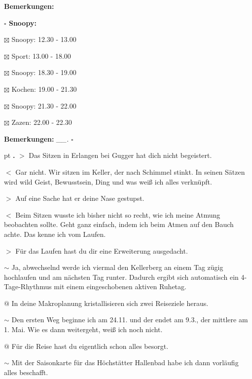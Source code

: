 \documentclass[10pt,a4paper]{article}
\newcounter{notec}
\newcommand\notep[1]{%
  \stepcounter{notec}
  \vskip #1pt
  {\bf\arabic{notec}.}
}
\newcommand\prop[1] {{\color {alizarin} {\bf #1}}}             %
\newcommand\mand[1] {{\color {burntorange} {\bf #1}}}          %
\newcommand\bottomspace{\vskip 4pt}
\newcommand\n[1] { {\sl #1.} \hskip 5pt }
\begin{document}
\begin{mdframed}[style=daystyle]
\begin{labeling}{{\mand {Bemerkungen:}}}
\begin{minipage}{0.75\textwidth}
\begin{labeling}{\prop {$\square$ {Snoopy:}}}
      \item[$\boxtimes$ Snoopy:] 12.30 - 13.00
      \item[$\boxtimes$ Sport:]  13.00 - 18.00
        
      \item[$\boxtimes$ Snoopy:] 18.30 - 19.00
      \item[$\boxtimes$ Kochen:] 19.00 - 21.30
        
      \item[$\boxtimes$ Snoopy:] 21.30 - 22.00
      \item[$\boxtimes$ Zazen:]  22.00 - 22.30
      \end{labeling}
    \end{minipage}
    \bottomspace
  \item[{\mand {Bemerkungen:}}]  \n{\_\_} {\prop {$\square$}}
  \end{labeling}
    
  \setcounter{notec}{0}
  
  \notep 0 $>$ Das Sitzen in Erlangen bei Gugger hat dich nicht begeistert.

  \vskip 2pt
  $<$ Gar nicht. Wir sitzen im Keller, der nach Schimmel stinkt. In seinen Sätzen
  wird wild Geist, Bewusstsein, Ding und was weiß ich alles verknüpft.

  \vskip 2pt
  $>$ Auf eine Sache hat er deine Nase gestupst.

  \vskip 2pt
  $<$ Beim Sitzen wusste ich bisher nicht so recht, wie ich meine Atmung
  beobachten sollte. Geht ganz einfach, indem ich beim Atmen auf den Bauch
  achte. Das kenne ich vom Laufen.

  \vskip 2pt
  $>$ Für das Laufen hast du dir eine Erweiterung ausgedacht.

  \vskip 2pt
  $\sim$ Ja, abwechselnd werde ich viermal den Kellerberg an einem Tag zügig
  hochlaufen und am nächsten Tag runter. Dadurch ergibt sich automatisch ein
  4-Tage-Rhythmus mit einem eingeschobenen aktiven Ruhetag.

  \vskip 2pt
  $@$ In deine Makroplanung kristallisieren sich zwei Reiseziele heraus.

  \vskip 2pt
  $\sim$ Den ersten Weg beginne ich am 24.11. und der endet am 9.3., der
  mittlere am 1. Mai. Wie es dann weitergeht, weiß ich noch nicht.

  \vskip 2pt
  $@$ Für die Reise hast du eigentlich schon alles besorgt.

  \vskip 2pt
  $\sim$ Mit der Saisonkarte für das Höchstätter Hallenbad habe ich dann
  vorläufig alles beschafft.


\end{mdframed}
\end{document}

